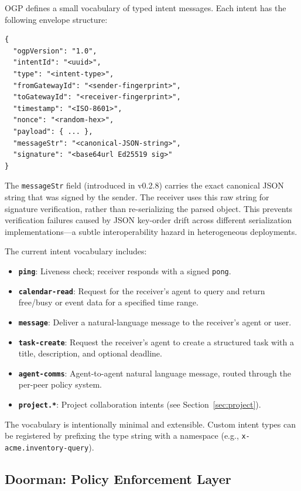 \documentclass[conference]{IEEEtran}
\begin{document}
OGP defines a small vocabulary of typed intent messages. Each intent has the following envelope structure:

\begin{lstlisting}
{
  "ogpVersion": "1.0",
  "intentId": "<uuid>",
  "type": "<intent-type>",
  "fromGatewayId": "<sender-fingerprint>",
  "toGatewayId": "<receiver-fingerprint>",
  "timestamp": "<ISO-8601>",
  "nonce": "<random-hex>",
  "payload": { ... },
  "messageStr": "<canonical-JSON-string>",
  "signature": "<base64url Ed25519 sig>"
}
\end{lstlisting}

The \texttt{messageStr} field (introduced in v0.2.8) carries the exact canonical JSON string that was signed by the sender. The receiver uses this raw string for signature verification, rather than re-serializing the parsed object. This prevents verification failures caused by JSON key-order drift across different serialization implementations---a subtle interoperability hazard in heterogeneous deployments.

The current intent vocabulary includes:

\begin{itemize}
  \item \textbf{\texttt{ping}}: Liveness check; receiver responds with a signed \texttt{pong}.
  \item \textbf{\texttt{calendar-read}}: Request for the receiver's agent to query and return free/busy or event data for a specified time range.
  \item \textbf{\texttt{message}}: Deliver a natural-language message to the receiver's agent or user.
  \item \textbf{\texttt{task-create}}: Request the receiver's agent to create a structured task with a title, description, and optional deadline.
  \item \textbf{\texttt{agent-comms}}: Agent-to-agent natural language message, routed through the per-peer policy system.
  \item \textbf{\texttt{project.*}}: Project collaboration intents (see Section~\ref{sec:project}).
\end{itemize}

The vocabulary is intentionally minimal and extensible. Custom intent types can be registered by prefixing the type string with a namespace (e.g., \texttt{x-acme.inventory-query}).

\subsection{Doorman: Policy Enforcement Layer}
\end{document}
